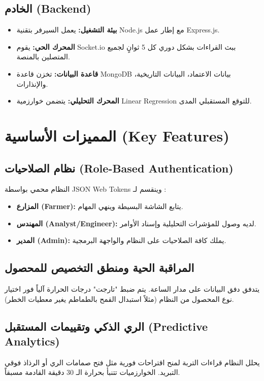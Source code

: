 \documentclass[12pt,a4paper]{article}
\begin{document}
\subsection{الخادم (Backend)}
\begin{itemize}
    \item \textbf{بيئة التشغيل:} يعمل السيرفر بتقنية Node.js مع إطار عمل Express.js.
    \item \textbf{المحرك الحي:} يقوم Socket.io ببث القراءات بشكل دوري كل 5 ثوانٍ لجميع المتصلين بالمنصة.
    \item \textbf{قاعدة البيانات:} تخزن قاعدة MongoDB بيانات الاعتماد، البيانات التاريخية، والإنذارات.
    \item \textbf{المحرك التحليلي:} يتضمن خوارزمية Linear Regression للتوقع المستقبلي المدى.
\end{itemize}

\vspace{0.5cm}

\section{المميزات الأساسية (Key Features)}

\subsection{نظام الصلاحيات (Role-Based Authentication)}
النظام محمي بواسطة JSON Web Tokens وينقسم لـ :
\begin{itemize}
    \item \textbf{المزارع (Farmer):} يتابع الشاشة البسيطة وينهي المهام.
    \item \textbf{المهندس (Analyst/Engineer):} لديه وصول للمؤشرات التحليلية وإسناد الأوامر.
    \item \textbf{المدير (Admin):} يملك كافة الصلاحيات على النظام والواجهة البرمجية.
\end{itemize}

\subsection{المراقبة الحية ومنطق التخصيص للمحصول}
يتدفق دفق البيانات على مدار الساعة. يتم ضبط "تارجت" درجات الحرارة آلياً فور اختيار نوع المحصول من النظام (مثلاً استبدال القمح بالطماطم يغير معطيات الخطر).

\subsection{الري الذكي وتقييمات المستقبل (Predictive Analytics)}
يحلل النظام قراءات التربة لمنح اقتراحات فورية مثل فتح صمامات الري أو الرذاذ فوقي التبريد. الخوارزميات تتنبأ بحرارة الـ 30 دقيقة القادمة مسبقاً.
\end{document}
